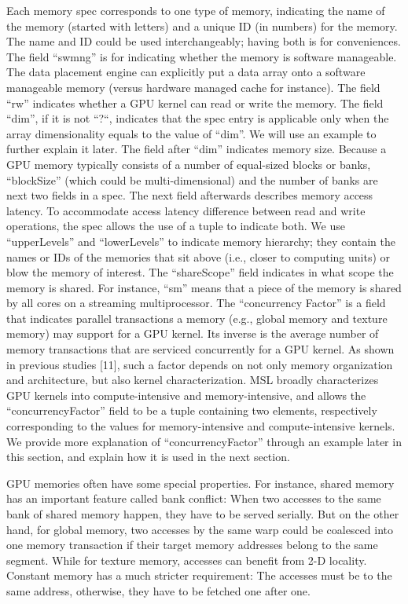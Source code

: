 \documentclass{sig-alternate}
\begin{document}
Each memory spec corresponds to one type of memory, indicating the name of the memory (started with letters) and a unique ID (in numbers) for the memory. The name and ID could be used interchangeably; having both is for conveniences. The field “swmng” is for indicating whether the memory is software manageable. The data placement engine can explicitly put a data array onto a software manageable memory (versus hardware managed cache for instance). The field “rw” indicates whether a GPU kernel can read or write the memory. The field “dim”, if it is not “?“, indicates that the spec entry is applicable only when the array dimensionality equals to the value of “dim”. We will use an example to further explain it later. The field after “dim” indicates memory size. Because a GPU memory typically consists of a number of equal-sized blocks or banks, “blockSize” (which could be multi-dimensional) and the number of banks are next two fields in a spec. The next field afterwards describes memory access latency. To accommodate access latency difference between read and write operations, the spec allows the use of a tuple to indicate both. We use “upperLevels” and “lowerLevels” to indicate memory hierarchy; they contain the names or IDs of the memories that sit above (i.e., closer to computing units) or blow the memory of interest. The “shareScope” field indicates in what scope the memory is shared. For instance, “sm” means that a piece of the memory is shared by all cores on a streaming multiprocessor. The “concurrency Factor” is a field that indicates parallel transactions a memory (e.g., global memory and texture memory) may support for a GPU kernel. Its inverse is the average number of memory transactions that are serviced concurrently for a GPU kernel. As shown in previous studies [11], such a factor depends on not only memory organization and architecture, but also kernel characterization. MSL broadly characterizes GPU kernels into compute-intensive and memory-intensive, and allows the “concurrencyFactor” field to be a tuple containing two elements, respectively corresponding to the values for memory-intensive and compute-intensive kernels. We provide more explanation of “concurrencyFactor” through an example later in this section, and explain how it is used in the next section.

GPU memories often have some special properties. For instance, shared memory has an important feature called bank conflict: When two accesses to the same bank of shared memory happen, they have to be served serially. But on the other hand, for global memory, two accesses by the same warp could be coalesced into one memory transaction if their target memory addresses belong to the same segment. While for texture memory, accesses can benefit from 2-D locality. Constant memory has a much stricter requirement: The accesses must be to the same address, otherwise, they have to be fetched one after one.
\end{document}
